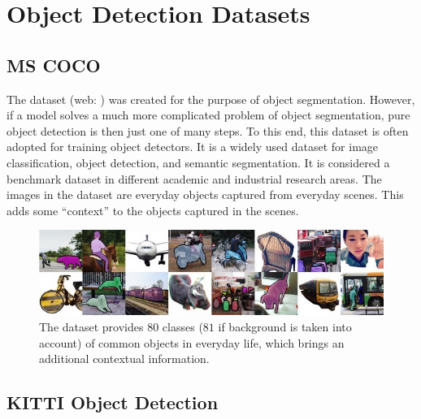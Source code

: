 \section{Object Detection Datasets}
\label{sec:ObjectDetectionDatasets}

\subsection{MS COCO}
\label{ssec:DatasetMSCOCO}

The  dataset \cite{Lin2014} (web: \cite{mscocodataset}) was created for the purpose of object segmentation. However, if a model solves a much more complicated problem of object segmentation, pure object detection is then just one of many steps. To this end, this dataset is often adopted for training object detectors. It is a widely used dataset for image classification, object detection, and semantic segmentation. It is considered a benchmark dataset in different academic and industrial research areas. The images in the dataset are everyday objects captured from everyday scenes. This adds some “context” to the objects captured in the scenes.

\begin{figure}[t]
    \centerline{\includegraphics[width=\linewidth]{figures/datasets/ms_coco_sample.jpeg}}
    \caption[ dataset]{The  dataset provides $80$ classes ($81$ if background is taken into account) of common objects in everyday life, which brings an additional contextual information. }
    \label{fig:DatasetMSCOCO}
\end{figure}

\subsection{KITTI Object Detection}
\label{ssec:DatasetKITTIObjectDetection}

